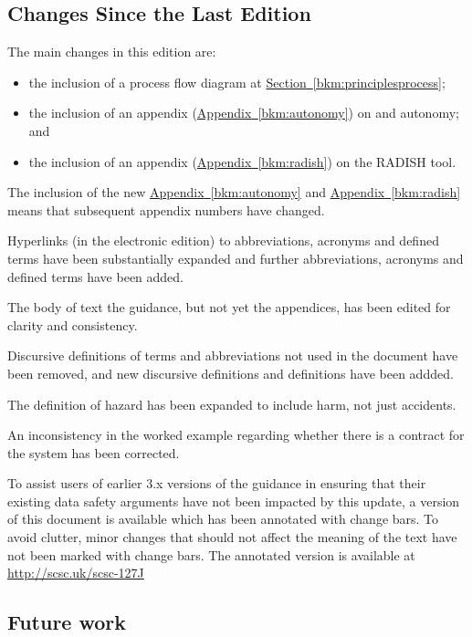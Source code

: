\subsection*{Changes Since the Last Edition}%
\cbstart The main changes in this edition are:
\begin{itemize}
\item the inclusion of a process flow diagram at \hyperref[bkm:principlesprocess]{{Section}~\ref{bkm:principlesprocess}};
\item the inclusion of an appendix (\hyperref[bkm:autonomy]{{Appendix}~\ref{bkm:autonomy}}) on  and autonomy; and
\item the inclusion of an appendix (\hyperref[bkm:radish]{{Appendix}~\ref{bkm:radish}}) on the RADISH tool.
\end{itemize}
The inclusion of the new \hyperref[bkm:autonomy]{{Appendix}~\ref{bkm:autonomy}} and \hyperref[bkm:radish]{{Appendix}~\ref{bkm:radish}} means that subsequent appendix numbers have changed.

Hyperlinks (in the electronic edition) to abbreviations, acronyms and defined terms have been substantially expanded and further abbreviations, acronyms and defined terms have been added.

The body of text the guidance, but not yet the appendices, has been edited for clarity and consistency.

Discursive definitions of terms and abbreviations not used in the document have been removed, and new discursive definitions and definitions have been addded.

The definition of hazard has been expanded to include harm, not just accidents.

An inconsistency in the worked example regarding whether there is a contract for the system has been corrected.

To assist users of earlier 3.x versions of the guidance in ensuring that their existing data safety arguments have not been impacted by this update, a version of this document is available which has been annotated with change bars. To avoid clutter, minor changes that should not affect the meaning of the text have not been marked with change bars. The annotated version is available at \href{http://scsc.uk/scsc-127J}{http://scsc.uk/scsc-127J}

\subsection*{Future work}

